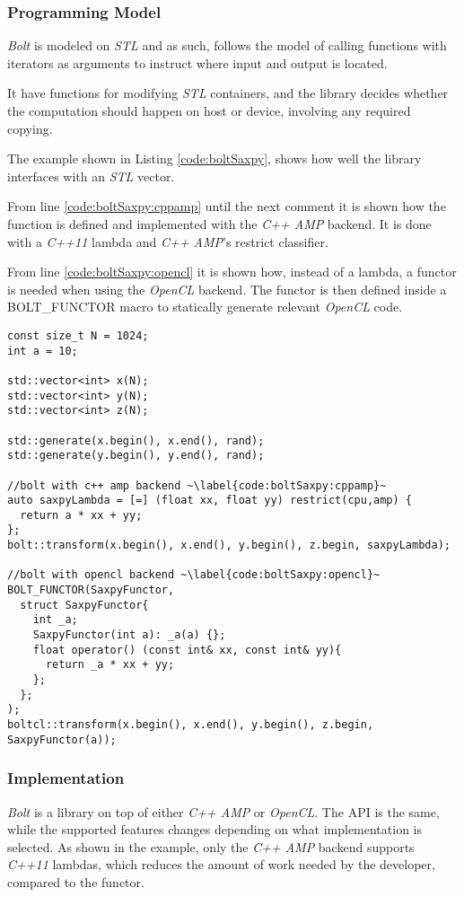 \subsubsection{Programming Model}
\textit{Bolt} is modeled on \textit{STL} and as such, follows the model of calling functions with iterators as arguments to instruct where input and output is located.

It have functions for modifying \textit{STL} containers, and the library decides whether the computation should happen on host or device, involving any required copying.

The example shown in Listing \ref{code:boltSaxpy}, shows how well the library interfaces with an \textit{STL} vector.

From line \ref{code:boltSaxpy:cppamp} until the next comment it is shown how the function is defined and implemented with the \textit{C++ AMP} backend. It is done with a \textit{C++11} lambda and \textit{C++ AMP}'s restrict classifier.

From line \ref{code:boltSaxpy:opencl} it is shown how, instead of a lambda, a functor is needed when using the \textit{OpenCL} backend. The functor is then defined inside a BOLT\_FUNCTOR macro to statically generate relevant \textit{OpenCL} code.

\begin{lstlisting}[caption={Bolt \textit{SAXPY} example}, label={code:boltSaxpy}]
const size_t N = 1024;
int a = 10;

std::vector<int> x(N);
std::vector<int> y(N);
std::vector<int> z(N);

std::generate(x.begin(), x.end(), rand);
std::generate(y.begin(), y.end(), rand);

//bolt with c++ amp backend ~\label{code:boltSaxpy:cppamp}~
auto saxpyLambda = [=] (float xx, float yy) restrict(cpu,amp) {
  return a * xx + yy;
};
bolt::transform(x.begin(), x.end(), y.begin(), z.begin, saxpyLambda);

//bolt with opencl backend ~\label{code:boltSaxpy:opencl}~
BOLT_FUNCTOR(SaxpyFunctor,
  struct SaxpyFunctor{
    int _a;
    SaxpyFunctor(int a): _a(a) {};
    float operator() (const int& xx, const int& yy){
      return _a * xx + yy;
    };
  };
);
boltcl::transform(x.begin(), x.end(), y.begin(), z.begin, SaxpyFunctor(a));
\end{lstlisting}

\subsubsection{Implementation}
\textit{Bolt} is a library on top of either \textit{C++ AMP} or \textit{OpenCL}. The API is the same, while the supported features changes depending on what implementation is selected.
As shown in the example, only the \textit{C++ AMP} backend supports \textit{C++11} lambdas, which reduces the amount of work needed by the developer, compared to the functor.

